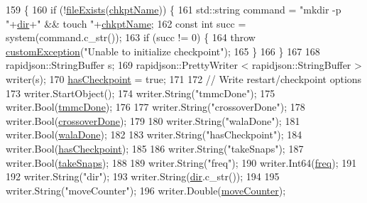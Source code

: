\begin{DoxyCode}
159                                                                                                            
                      \{
160     \textcolor{keywordflow}{if} (!\hyperlink{utilities_8cpp_a9d1e3672fd331d4185c1763c80226307}{fileExists}(\hyperlink{classcheckpoint_a477eea21621f066889660ed426dc800f}{chkptName})) \{
161         std::string command = \textcolor{stringliteral}{"mkdir -p "}+\hyperlink{classcheckpoint_a0e0f999ee8e0b09541e9131baa8a591d}{dir}+\textcolor{stringliteral}{" && touch "}+\hyperlink{classcheckpoint_a477eea21621f066889660ed426dc800f}{chkptName};
162         \textcolor{keyword}{const} \textcolor{keywordtype}{int} succ = system(command.c\_str());
163         \textcolor{keywordflow}{if} (succ != 0) \{
164             \textcolor{keywordflow}{throw} \hyperlink{classcustom_exception}{customException}(\textcolor{stringliteral}{"Unable to initialize checkpoint"});
165         \}
166     \}
167 
168     rapidjson::StringBuffer s;
169     rapidjson::PrettyWriter < rapidjson::StringBuffer > writer(s);
170     \hyperlink{classcheckpoint_aa75f306fcb0c2360d948fa3a61adfed5}{hasCheckpoint} = \textcolor{keyword}{true};
171 
172     \textcolor{comment}{// Write restart/checkpoint options}
173     writer.StartObject();
174     writer.String(\textcolor{stringliteral}{"tmmcDone"});
175     writer.Bool(\hyperlink{classcheckpoint_acbe0c62aa82735741a9f396827966823}{tmmcDone});
176 
177     writer.String(\textcolor{stringliteral}{"crossoverDone"});
178     writer.Bool(\hyperlink{classcheckpoint_a4f13612ea6d376bb327295bfce3a70c5}{crossoverDone});
179 
180     writer.String(\textcolor{stringliteral}{"walaDone"});
181     writer.Bool(\hyperlink{classcheckpoint_aab066479e2ca6656d0031dd46a2fc1a5}{walaDone});
182 
183     writer.String(\textcolor{stringliteral}{"hasCheckpoint"});
184     writer.Bool(\hyperlink{classcheckpoint_aa75f306fcb0c2360d948fa3a61adfed5}{hasCheckpoint});
185 
186     writer.String(\textcolor{stringliteral}{"takeSnaps"});
187     writer.Bool(\hyperlink{classcheckpoint_a685226e8bae8084937f73f65c326c362}{takeSnaps});
188 
189     writer.String(\textcolor{stringliteral}{"freq"});
190     writer.Int64(\hyperlink{classcheckpoint_a11a2d78eb0bf6045b659a4d18b53da44}{freq});
191 
192     writer.String(\textcolor{stringliteral}{"dir"});
193     writer.String(\hyperlink{classcheckpoint_a0e0f999ee8e0b09541e9131baa8a591d}{dir}.c\_str());
194 
195     writer.String(\textcolor{stringliteral}{"moveCounter"});
196     writer.Double(\hyperlink{classcheckpoint_a5ab49a355714da4874aba00eb03f701d}{moveCounter});

\end{DoxyCode}

